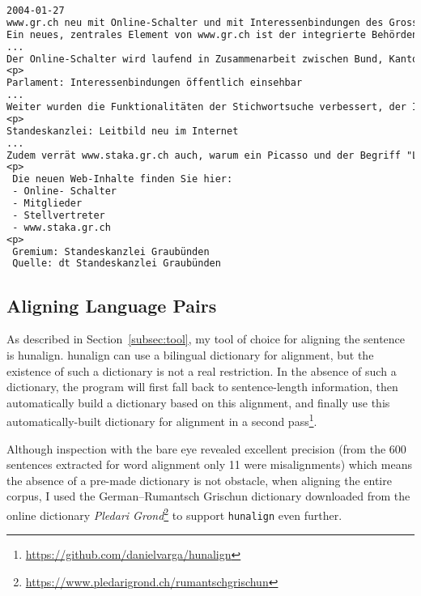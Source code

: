 \begin{lstlisting}[language=txt, caption={[An excerpt from a file containing sentences for alignment.]An excerpt from a  file containing sentences for alignment. 
In order to keep the file structured and increase alignment performance, each document starts with a date and paragraph are boundaries are marked with a special \texttt{<p>} token.}, captionpos=t, label={lst:sentences}]
2004-01-27
www.gr.ch neu mit Online-Schalter und mit Interessenbindungen des Grossen Rats
Ein neues, zentrales Element von www.gr.ch ist der integrierte Behörden-Online-Schalter www.ch.ch.
...
Der Online-Schalter wird laufend in Zusammenarbeit zwischen Bund, Kantonen und Gemeinden weiterentwickelt und inhaltlich erweitert.
<p>
Parlament: Interessenbindungen öffentlich einsehbar 
...
Weiter wurden die Funktionalitäten der Stichwortsuche verbessert, der Informationsgehalt im Bereich "Unser Kanton" erweitert ("Produkte aus Graubünden", Suchmaschine für Graubünden) sowie der Sprachenwechsel zwischen den Inhalten in deutsch, romanisch und italienisch vereinfacht.
<p>
Standeskanzlei: Leitbild neu im Internet 
...
Zudem verrät www.staka.gr.ch auch, warum ein Picasso und der Begriff "Light" ohne weiteres mit der Standeskanzlei Graubünden in Zusammenhang gebracht werden können.
<p>
 Die neuen Web-Inhalte finden Sie hier: 
 - Online- Schalter 
 - Mitglieder 
 - Stellvertreter
 - www.staka.gr.ch 
<p>
 Gremium: Standeskanzlei Graubünden 
 Quelle: dt Standeskanzlei Graubünden
\end{lstlisting}

\subsection{Aligning Language Pairs}
\label{sec:aligning-language-pairs}
As described in Section~\ref{subsec:tool}, my tool of choice for aligning the sentence is hunalign. 
hunalign can use a bilingual dictionary for alignment, but the existence of such a dictionary is not a real restriction. 
In the absence of such a dictionary, the program will first fall back to sentence-length information, then automatically build a dictionary based on this alignment, and finally use this automatically-built dictionary for alignment in a second pass\footnote{\url{https://github.com/danielvarga/hunalign}}.

Although inspection with the bare eye revealed excellent precision (from the 600 sentences extracted for word alignment only 11 were misalignments) which means the absence of a pre-made dictionary is not obstacle, when aligning the entire corpus, I used the German--Rumantsch Grischun dictionary downloaded from the online dictionary \emph{Pledari Grond}\footnote{\url{https://www.pledarigrond.ch/rumantschgrischun}} to support \texttt{hunalign} even further.

